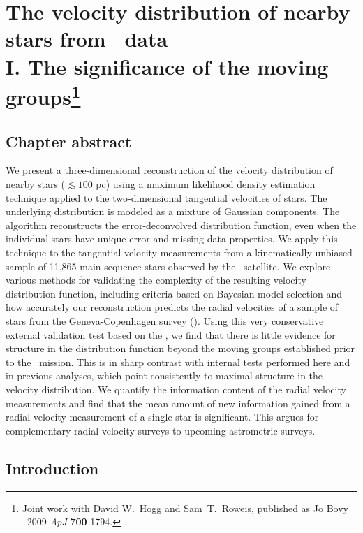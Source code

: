 
\chapter[The velocity distribution of nearby stars from \Hipparcos\ data I. The significance of the moving groups]{The velocity distribution of nearby stars from \Hipparcos\ data\\
I. The significance of the moving groups\protect\footnote{Joint work
with David W.~Hogg and Sam~T.~Roweis, published as Jo Bovy \etal\
2009 \emph{ApJ} {\bf 700} 1794.}}

\section{Chapter abstract}
We present a three-dimensional reconstruction of the velocity
distribution of nearby stars ($\lesssim 100$ pc) using a maximum
likelihood density estimation technique applied to the two-dimensional
tangential velocities of stars. The underlying distribution is modeled
as a mixture of Gaussian components. The algorithm reconstructs the
error-deconvolved distribution function, even when the individual
stars have unique error and missing-data properties. We apply this
technique to the tangential velocity measurements from a kinematically
unbiased sample of 11,865 main sequence stars observed by the
\Hipparcos\ satellite.  We explore various methods for validating the
complexity of the resulting velocity distribution function, including
criteria based on Bayesian model selection and how accurately our
reconstruction predicts the radial velocities of a sample of stars
from the Geneva-Copenhagen survey (\gcsabb). Using this very
conservative external validation test based on the \gcsabb, we find
that there is little evidence for structure in the distribution
function beyond the moving groups established prior to the \Hipparcos\
mission. This is in sharp contrast with internal tests performed here
and in previous analyses, which point consistently to maximal
structure in the velocity distribution. We quantify the information
content of the radial velocity measurements and find that the mean
amount of new information gained from a radial velocity measurement of
a single star is significant. This argues for complementary radial
velocity surveys to upcoming astrometric surveys.


\section{Introduction}

